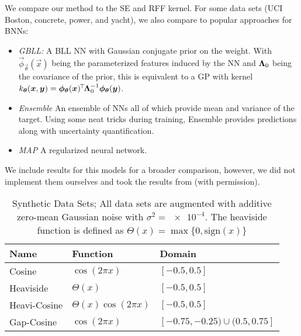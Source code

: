 	We compare our method to the \ac{SE} and \ac{RFF} kernel.
	For some data sets (\ac{UCI} Boston, concrete, power, and yacht), we also compare to popular approaches for \acp{BNN}:
	\begin{itemize}
		\item \emph{\ac{GBLL}:}
			A \ac{BLL} \ac{NN} with Gaussian conjugate prior on the weight.
			With $\vec{\phi}_{\vec{\theta}}(\vec{x})$ being the parameterized features induced by the \ac{NN} and $\bm{\mathrm{\Lambda}}_0$ being the covariance of the prior, this is equivalent to a \ac{GP} with kernel $k_{\bm{\theta}}(\bm{x}, \bm{y}) = \bm{\phi}_{\bm{\theta}}(\bm{x})^{\!\top\!} \bm{\mathrm{\Lambda}}_0^{-1} \bm{\phi}_{\bm{\theta}}(\bm{y})$\cite{rasmussenGaussianProcessesMachine2006}.
		\item \emph{Ensemble}\cite{lakshminarayananSimpleScalablePredictive2017}
			An ensemble of \acp{NN} all of which provide mean and variance of the target.
			Using some neat tricks during training, Ensemble provides predictions along with uncertainty quantification.
		\item \emph{\ac{MAP}}
			A regularized neural network.
	\end{itemize}
	We include results for this models for a broader comparison, however, we did not implement them ourselves and took the results from\cite{watsonLatentDerivativeBayesian2021} (with permission).

	\begin{table}
		\centering
		\begin{tabular}{lll}
			\toprule
			\textbf{Name}         & \textbf{Function}         & \textbf{Domain}                   \\ \midrule
			Cosine                & $\cos(2 \pi x)$           & $[-0.5, 0.5]$                     \\
			Heaviside\superdagger & $\Theta(x)$               & $[-0.5, 0.5]$                     \\
			Heavi-Cosine          & $\Theta(x) \cos(2 \pi x)$ & $[-0.5, 0.5]$                     \\
			Gap-Cosine            & $\cos(2 \pi x)$           & $[-0.75, -0.25) \cup (0.5, 0.75]$ \\ \bottomrule
		\end{tabular}
		\caption{
			Synthetic Data Sets;
			All data sets are augmented with additive zero-mean Gaussian noise with $\sigma^2 = \num{e-4}$.
			\superdagger{}The heaviside function is defined as $ \Theta(x) = \max\{ 0, \mathrm{sign}(x) \} $
		}
		\label{tab:dataSynthetic}
	\end{table}

